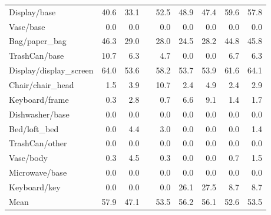 \begin{table}[!h]
\begin{tabular}{lrrrrrrrr}
Display/base             &             40.6 &                 33.1 &&    52.5 &            48.9 &                    47.4 &          59.6 &                  57.8 \\
Vase/base                &              0.0 &                  0.0 &&     0.0 &             0.0 &                     0.0 &           0.0 &                   0.0 \\
Bag/paper\_bag            &             46.3 &                 29.0 &&    28.0 &            24.5 &                    28.2 &          44.8 &                  45.8 \\
TrashCan/base            &             10.7 &                  6.3 &&     4.7 &             0.0 &                     0.0 &           6.7 &                   6.3 \\
Display/display\_screen   &             64.0 &                 53.6 &&    58.2 &            53.7 &                    53.9 &          61.6 &                  64.1 \\
Chair/chair\_head         &              1.5 &                  3.9 &&    10.7 &             2.4 &                     4.9 &           2.4 &                   2.9 \\
Keyboard/frame           &              0.3 &                  2.8 &&     0.7 &             6.6 &                     9.1 &           1.4 &                   1.7 \\
Dishwasher/base          &              0.0 &                  0.0 &&     0.0 &             0.0 &                     0.0 &           0.0 &                   0.0 \\
Bed/loft\_bed             &              0.0 &                  4.4 &&     3.0 &             0.0 &                     0.0 &           0.0 &                   1.4 \\
TrashCan/other           &              0.0 &                  0.0 &&     0.0 &             0.0 &                     0.0 &           0.0 &                   0.0 \\
Vase/body                &              0.3 &                  4.5 &&     0.3 &             0.0 &                     0.0 &           0.7 &                   1.5 \\
Microwave/base           &              0.0 &                  0.0 &&     0.0 &             0.0 &                     0.0 &           0.0 &                   0.0 \\
Keyboard/key             &              0.0 &                  0.0 &&     0.0 &            26.1 &                    27.5 &           8.7 &                   8.7 \\
\midrule
Mean                     &             57.9 &                 47.1 &&    53.5 &            56.2 &                    56.1 &          52.6 &                  53.5 \\
\bottomrule
\end{tabular}
\end{table}

